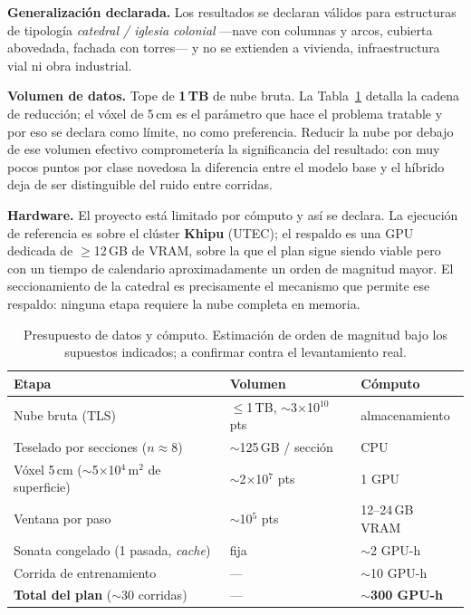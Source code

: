 \documentclass[9pt,twocolumn,a4paper]{extarticle}
\begin{document}
\textbf{Generalización declarada.} Los resultados se declaran válidos para
estructuras de tipología \emph{catedral / iglesia colonial} ---nave con
columnas y arcos, cubierta abovedada, fachada con torres--- y no se extienden
a vivienda, infraestructura vial ni obra industrial.

\textbf{Volumen de datos.} Tope de \textbf{1\,TB} de nube bruta. La
Tabla~\ref{tab:comp} detalla la cadena de reducción; el vóxel de 5\,cm es el
parámetro que hace el problema tratable y por eso se declara como límite, no
como preferencia. Reducir la nube por debajo de ese volumen efectivo
comprometería la significancia del resultado: con muy pocos puntos por clase
novedosa la diferencia entre el modelo base y el híbrido deja de ser
distinguible del ruido entre corridas.

\textbf{Hardware.} El proyecto está limitado por cómputo y así se declara. La
ejecución de referencia es sobre el clúster \textbf{Khipu} (UTEC); el
respaldo es una GPU dedicada de $\geq$12\,GB de VRAM, sobre la que el plan
sigue siendo viable pero con un tiempo de calendario aproximadamente un orden
de magnitud mayor. El seccionamiento de la catedral es precisamente el
mecanismo que permite ese respaldo: ninguna etapa requiere la nube completa
en memoria.

\begin{table}[t]
\centering
\small
\setlength{\tabcolsep}{4pt}
\caption{Presupuesto de datos y cómputo. Estimación de orden de magnitud bajo
los supuestos indicados; a confirmar contra el levantamiento real.}
\label{tab:comp}
\begin{tabular}{@{}p{3.0cm}p{2.1cm}p{2.4cm}@{}}
\toprule
\textbf{Etapa} & \textbf{Volumen} & \textbf{Cómputo} \\
\midrule
Nube bruta (TLS) & $\leq$1\,TB, $\sim$3$\times$10$^{10}$ pts & almacenamiento \\
Teselado por secciones ($n{\approx}8$) & $\sim$125\,GB / sección & CPU \\
Vóxel 5\,cm ($\sim$5$\times$10$^{4}$\,m$^2$ de superficie) & $\sim$2$\times$10$^{7}$ pts & 1 GPU \\
Ventana por paso & $\sim$10$^{5}$ pts & 12--24\,GB VRAM \\
Sonata congelado (1 pasada, \emph{cache}) & fija & $\sim$2 GPU-h \\
Corrida de entrenamiento & --- & $\sim$10 GPU-h \\
\midrule
\textbf{Total del plan} ($\sim$30 corridas) & --- & \textbf{$\sim$300 GPU-h} \\
\bottomrule
\end{tabular}
\end{table}
\end{document}
